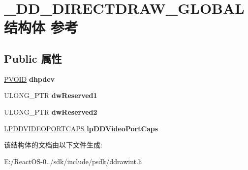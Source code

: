 \hypertarget{struct___d_d___d_i_r_e_c_t_d_r_a_w___g_l_o_b_a_l}{}\section{\+\_\+\+D\+D\+\_\+\+D\+I\+R\+E\+C\+T\+D\+R\+A\+W\+\_\+\+G\+L\+O\+B\+A\+L结构体 参考}
\label{struct___d_d___d_i_r_e_c_t_d_r_a_w___g_l_o_b_a_l}
\subsection*{Public 属性}
\begin{DoxyCompactItemize}
\item 
\mbox{\label{struct___d_d___d_i_r_e_c_t_d_r_a_w___g_l_o_b_a_l_a2027e88448e8667eb72ec0650bb9abf1}} 
\hyperlink{interfacevoid}{P\+V\+O\+ID} {\bfseries dhpdev}
\item 
\mbox{\label{struct___d_d___d_i_r_e_c_t_d_r_a_w___g_l_o_b_a_l_a475186dbbaa71edcf23ea00a3fa47418}} 
U\+L\+O\+N\+G\+\_\+\+P\+TR {\bfseries dw\+Reserved1}
\item 
\mbox{\label{struct___d_d___d_i_r_e_c_t_d_r_a_w___g_l_o_b_a_l_a92de612747709d3be85cf5f1879db52e}} 
U\+L\+O\+N\+G\+\_\+\+P\+TR {\bfseries dw\+Reserved2}
\item 
\mbox{\label{struct___d_d___d_i_r_e_c_t_d_r_a_w___g_l_o_b_a_l_ae327397c53589ab49c037832c643cb58}} 
\hyperlink{struct___d_d_v_i_d_e_o_p_o_r_t_c_a_p_s}{L\+P\+D\+D\+V\+I\+D\+E\+O\+P\+O\+R\+T\+C\+A\+PS} {\bfseries lp\+D\+D\+Video\+Port\+Caps}
\end{DoxyCompactItemize}


该结构体的文档由以下文件生成\+:\begin{DoxyCompactItemize}
\item 
E\+:/\+React\+O\+S-\/0../sdk/include/psdk/ddrawint.\+h\end{DoxyCompactItemize}
